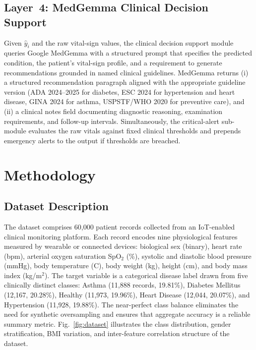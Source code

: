 \documentclass[journal]{IEEEtran}
\begin{document}
\subsection{Layer~4: MedGemma Clinical Decision Support}

Given $\hat{y}_i$ and the raw vital-sign values, the clinical decision
support module queries Google MedGemma with a structured prompt that
specifies the predicted condition, the patient's vital-sign profile, and
a requirement to generate recommendations grounded in named clinical
guidelines. MedGemma returns (i) a structured recommendation paragraph
aligned with the appropriate guideline version (ADA 2024--2025 for
diabetes, ESC 2024 for hypertension and heart disease, GINA 2024 for
asthma, USPSTF/WHO 2020 for preventive care), and (ii) a clinical notes
field documenting diagnostic reasoning, examination requirements, and
follow-up intervals. Simultaneously, the critical-alert sub-module
evaluates the raw vitals against fixed clinical thresholds and prepends
emergency alerts to the output if thresholds are breached.

\section{Methodology}
\label{sec:method}

\subsection{Dataset Description}

The dataset comprises 60,000 patient records collected from an IoT-enabled
clinical monitoring platform. Each record encodes nine physiological features
measured by wearable or connected devices: biological sex (binary), heart
rate (bpm), arterial oxygen saturation SpO$_2$ (\%), systolic and diastolic
blood pressure (mmHg), body temperature (\textdegree{}C), body weight (kg),
height (cm), and body mass index (kg/m$^2$). The target variable is a
categorical disease label drawn from five clinically distinct classes:
Asthma (11,888 records, 19.81\%), Diabetes Mellitus (12,167, 20.28\%),
Healthy (11,973, 19.96\%), Heart Disease (12,044, 20.07\%), and Hypertension
(11,928, 19.88\%). The near-perfect class balance eliminates the need for
synthetic oversampling and ensures that aggregate accuracy is a reliable
summary metric. Fig.~\ref{fig:dataset} illustrates the class distribution,
gender stratification, BMI variation, and inter-feature correlation
structure of the dataset.
\end{document}
